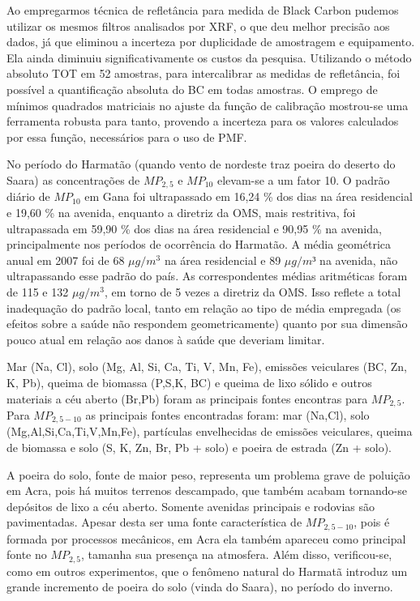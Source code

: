 Ao empregarmos técnica de refletância para medida de Black Carbon pudemos utilizar os mesmos filtros analisados por XRF, o que deu melhor precisão aos dados, já que eliminou a incerteza por duplicidade de amostragem e equipamento. Ela ainda diminuiu significativamente os custos da pesquisa. Utilizando o método absoluto TOT em 52 amostras, para intercalibrar as medidas de refletância, foi possível a quantificação absoluta do BC em todas amostras. O emprego de mínimos quadrados matriciais no ajuste da função de calibração mostrou-se uma ferramenta robusta para tanto, provendo a incerteza para os valores calculados por essa função, necessários para o uso de PMF.

No período do Harmatão (quando vento de nordeste traz poeira do deserto do Saara) as concentrações de $MP_{2,5}$ e $MP_{10}$ elevam-se a um fator 10. O padrão diário de $MP_{10}$ em Gana foi ultrapassado em 16,24 \% dos dias na área residencial e 19,60 \% na avenida, enquanto a diretriz da OMS, mais restritiva, foi ultrapassada em 59,90 \% dos dias na área residencial e 90,95 \% na avenida, principalmente nos períodos de ocorrência do Harmatão. A média geométrica anual em 2007 foi de 68 $\mu g/m^3$ na área residencial e 89 $\mu g/m³$ na avenida, não ultrapassando esse padrão do país. As correspondentes médias aritméticas foram de 115 e 132 $\mu g/m^3$, em torno de 5 vezes a diretriz da OMS. Isso reflete a total inadequação do padrão local, tanto em relação ao tipo de média empregada (os efeitos sobre a saúde não respondem geometricamente) quanto por sua dimensão pouco atual em relação aos danos à saúde que deveriam limitar.

Mar (Na, Cl), solo (Mg, Al, Si, Ca, Ti, V, Mn, Fe), emissões veiculares (BC, Zn, K, Pb), queima de biomassa (P,S,K, BC) e queima de lixo sólido e outros materiais a céu aberto (Br,Pb) foram as principais fontes encontras para $MP_{2,5}$. Para $MP_{2,5-10}$ as principais fontes encontradas foram: mar (Na,Cl), solo (Mg,Al,Si,Ca,Ti,V,Mn,Fe), partículas envelhecidas de emissões veiculares, queima de biomassa e solo (S, K, Zn, Br, Pb + solo) e poeira de estrada (Zn + solo).

A poeira do solo, fonte de maior peso, representa um problema grave de poluição em Acra, pois há muitos terrenos descampado, que também acabam tornando-se depósitos de lixo a céu aberto. Somente avenidas principais e rodovias são pavimentadas. Apesar desta ser uma fonte característica de $MP_{2,5-10}$, pois é formada por processos mecânicos, em Acra ela também apareceu como principal fonte no $MP_{2,5}$, tamanha sua presença na atmosfera. Além disso, verificou-se, como em outros experimentos, que o fenômeno natural do Harmatã introduz um grande incremento de poeira do solo (vinda do Saara), no período do inverno.

